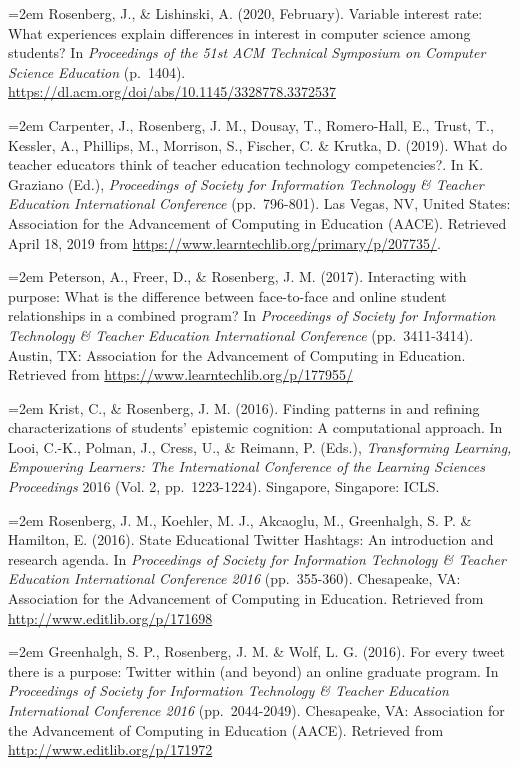 \documentclass[
  14,
]{article}
\begin{document}
\hangindent=2em Rosenberg, J., \& Lishinski, A. (2020, February).
Variable interest rate: What experiences explain differences in interest
in computer science among students? In \emph{Proceedings of the 51st ACM
Technical Symposium on Computer Science Education} (p.~1404).
\url{https://dl.acm.org/doi/abs/10.1145/3328778.3372537}

\hangindent=2em Carpenter, J., Rosenberg, J. M., Dousay, T.,
Romero-Hall, E., Trust, T., Kessler, A., Phillips, M., Morrison, S.,
Fischer, C. \& Krutka, D. (2019). What do teacher educators think of
teacher education technology competencies?. In K. Graziano (Ed.),
\emph{Proceedings of Society for Information Technology \& Teacher
Education International Conference} (pp.~796-801). Las Vegas, NV, United
States: Association for the Advancement of Computing in Education
(AACE). Retrieved April 18, 2019 from
\url{https://www.learntechlib.org/primary/p/207735/}.

\hangindent=2em Peterson, A., Freer, D., \& Rosenberg, J. M. (2017).
Interacting with purpose: What is the difference between face-to-face
and online student relationships in a combined program? In
\emph{Proceedings of Society for Information Technology \& Teacher
Education International Conference} (pp.~3411-3414). Austin, TX:
Association for the Advancement of Computing in Education. Retrieved
from \url{https://www.learntechlib.org/p/177955/}

\hangindent=2em Krist, C., \& Rosenberg, J. M. (2016). Finding patterns
in and refining characterizations of students' epistemic cognition: A
computational approach. In Looi, C.-K., Polman, J., Cress, U., \&
Reimann, P. (Eds.), \emph{Transforming Learning, Empowering Learners:
The International Conference of the Learning Sciences Proceedings} 2016
(Vol. 2, pp.~1223-1224). Singapore, Singapore: ICLS.

\hangindent=2em Rosenberg, J. M., Koehler, M. J., Akcaoglu, M.,
Greenhalgh, S. P. \& Hamilton, E. (2016). State Educational Twitter
Hashtags: An introduction and research agenda. In \emph{Proceedings of
Society for Information Technology \& Teacher Education International
Conference 2016} (pp.~355-360). Chesapeake, VA: Association for the
Advancement of Computing in Education. Retrieved from
\url{http://www.editlib.org/p/171698}

\hangindent=2em Greenhalgh, S. P., Rosenberg, J. M. \& Wolf, L. G.
(2016). For every tweet there is a purpose: Twitter within (and beyond)
an online graduate program. In \emph{Proceedings of Society for
Information Technology \& Teacher Education International Conference
2016} (pp.~2044-2049). Chesapeake, VA: Association for the Advancement
of Computing in Education (AACE). Retrieved from
\url{http://www.editlib.org/p/171972}
\end{document}
